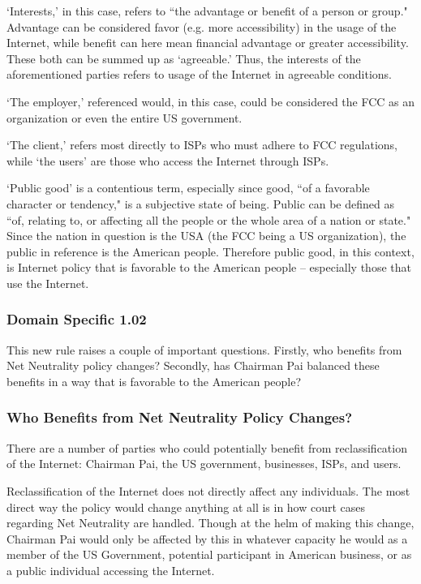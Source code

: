 \documentclass[12pt]{article}
\begin{document}
\begin{multicols}{2}
`Interests,' in this case, refers to ``the advantage or benefit of a person or group."\cite{oxford}  Advantage can be considered favor (e.g. more accessibility) in the usage of the Internet, while benefit can here mean financial advantage or greater accessibility. These both can be summed up as `agreeable.' Thus, the interests of the aforementioned parties refers to usage of the Internet in agreeable conditions.

`The employer,' referenced would, in this case, could be considered the FCC as an organization or even the entire US government.

`The client,' refers most directly to ISPs who must adhere to FCC regulations, while `the users' are those who access the Internet through ISPs.

`Public good' is a contentious term, especially since good, ``of a favorable character or tendency," is a subjective state of being.\cite{webster} Public can be defined as ``of, relating to, or affecting all the people or the whole area of a nation or state."\cite{webster} Since the nation in question is the USA (the FCC being a US organization), the public in reference is the American people. Therefore public good, in this context, is Internet policy that is favorable to the American people -- especially those that use the Internet.

\newpage %

\subsubsection{Domain Specific 1.02}

This new rule raises a couple of important questions. Firstly, who benefits from Net Neutrality policy changes? Secondly, has Chairman Pai balanced these benefits in a way that is favorable to the American people?

\subsubsection{Who Benefits from Net Neutrality Policy Changes?}
There are a number of parties who could potentially benefit from reclassification of the Internet: Chairman Pai, the US government, businesses, ISPs, and users.

Reclassification of the Internet does not directly affect any individuals. The most direct way the policy would change anything at all is in how court cases regarding Net Neutrality are handled.\cite{eff-pro-net} Though at the helm of making this change, Chairman Pai would only be affected by this in whatever capacity he would as a member of the US Government, potential participant in American business, or as a public individual accessing the Internet.


\end{multicols}
\end{document}
